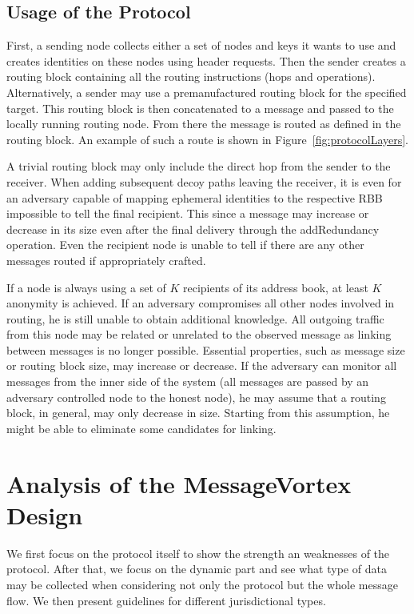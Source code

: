 \documentclass[10pt,journal,compsoc,twocolumn,twoside]{IEEEtran}
\begin{document}
\subsection{Usage of the Protocol}
First, a sending node collects either a set of nodes and keys it wants to use and creates identities on these nodes using header requests. Then the sender creates a routing block containing all the routing instructions (hops and operations). Alternatively, a sender may use a premanufactured routing block for the specified target. This routing block is then concatenated to a message and passed to the locally running routing node. From there the message is routed as defined in the routing block. An example of such a route is shown in Figure~\ref{fig:protocolLayers}.

A trivial routing block may only include the direct hop from the sender to the receiver. When adding subsequent decoy paths leaving the receiver, it is even for an adversary capable of mapping ephemeral identities to the respective RBB impossible to tell the final recipient. This since a message may increase or decrease in its size even after the final delivery through the addRedundancy operation. Even the recipient node is unable to tell if there are any other messages routed if appropriately crafted.

If a node is always using a set of $K$ recipients of its address book, at least $K$ anonymity is achieved. If an adversary compromises all other nodes involved in routing, he is still unable to obtain additional knowledge. All outgoing traffic from this node may be related or unrelated to the observed message as linking between messages is no longer possible. Essential properties, such as message size or routing block size, may increase or decrease. If the adversary can monitor all messages from the inner side of the system (all messages are passed by an adversary controlled node to the honest node), he may assume that a routing block, in general, may only decrease in size. Starting from this assumption, he might be able to eliminate some candidates for linking.

\section{Analysis of the MessageVortex Design\label{sec:discussion}}
We first focus on the protocol itself to show the strength an weaknesses of the protocol. After that, we focus on the dynamic part and see what type of data may be collected when considering not only the protocol but the whole message flow. We then present guidelines for different jurisdictional types.
\end{document}
